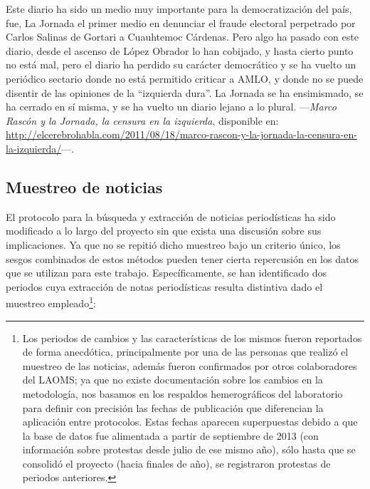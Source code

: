 \documentclass[letterpaper, 11pt]{book}
\theoremstyle{definition}
\theoremstyle{remark}
\begin{document}
\begin{center}
    \begin{minipage}{0.9\linewidth}
        {\setlength{\parindent}{12pt}\small
	    Este diario ha sido un medio muy importante para la democratización del país, fue, La Jornada el primer medio en denunciar el fraude electoral perpetrado por Carlos Salinas de Gortari a Cuauhtemoc Cárdenas. Pero algo ha pasado con este diario, desde el ascenso de López Obrador lo han cobijado, y hasta cierto punto no está mal, pero el diario ha perdido su carácter democrático y se ha vuelto un periódico sectario donde no está permitido criticar a AMLO, y donde no se puede disentir de las opiniones de la ``izquierda dura''. La Jornada se ha ensimismado, se ha cerrado en sí misma, y se ha vuelto un diario lejano a lo plural.  \normalsize ---\emph{Marco Rascón y la Jornada, la censura en la izquierda}, disponible en: \url{http://elcerebrohabla.com/2011/08/18/marco-rascon-y-la-jornada-la-censura-en-la-izquierda/}---.
        }
    \end{minipage}
\end{center}





\subsection{Muestreo de noticias}
\label{sec:NotiMuestreo}

El protocolo para la búsqueda y extracción de noticias periodísticas ha sido modificado a lo largo del proyecto sin que exista una discusión sobre sus implicaciones. 
Ya que no se repitió dicho muestreo bajo un criterio único, los sesgos combinados de estos métodos pueden tener cierta repercusión en los datos que se utilizan para este trabajo. 
Específicamente, se han identificado dos periodos cuya extracción de notas periodísticas resulta distintiva dado el muestreo empleado\footnote{
    Los periodos de cambios y las características de los mismos fueron reportados de forma anecdótica, principalmente por una de las personas que realizó el muestreo de las noticias, además fueron confirmados por otros colaboradores del LAOMS; ya que no existe documentación sobre los cambios en la metodología, nos basamos en los respaldos hemerográficos del laboratorio para definir con precisión las fechas de publicación que diferencian la aplicación entre protocolos. 
    Estas fechas aparecen superpuestas debido a que la base de datos fue alimentada a partir de septiembre de 2013 (con información sobre protestas desde julio de ese mismo año), sólo hasta que se consolidó el proyecto (hacia finales de año), se registraron protestas de periodos anteriores. 
}: 
\end{document}
